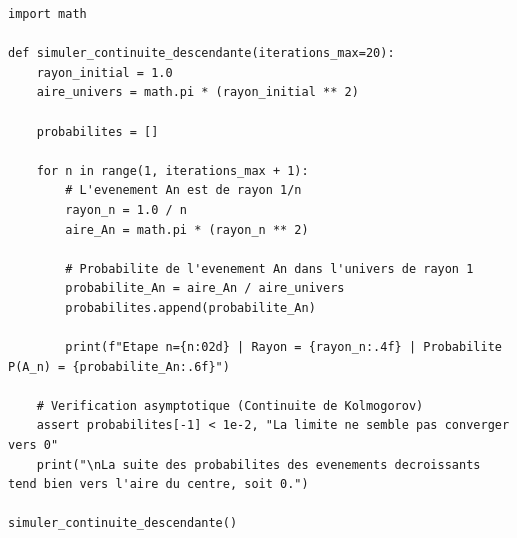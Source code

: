 \documentclass[11pt,a4paper]{article}
\begin{document}
\begin{lstlisting}
import math

def simuler_continuite_descendante(iterations_max=20):
    rayon_initial = 1.0
    aire_univers = math.pi * (rayon_initial ** 2)

    probabilites = []

    for n in range(1, iterations_max + 1):
        # L'evenement An est de rayon 1/n
        rayon_n = 1.0 / n
        aire_An = math.pi * (rayon_n ** 2)

        # Probabilite de l'evenement An dans l'univers de rayon 1
        probabilite_An = aire_An / aire_univers
        probabilites.append(probabilite_An)

        print(f"Etape n={n:02d} | Rayon = {rayon_n:.4f} | Probabilite P(A_n) = {probabilite_An:.6f}")

    # Verification asymptotique (Continuite de Kolmogorov)
    assert probabilites[-1] < 1e-2, "La limite ne semble pas converger vers 0"
    print("\nLa suite des probabilites des evenements decroissants tend bien vers l'aire du centre, soit 0.")

simuler_continuite_descendante()
\end{lstlisting}
\end{document}
